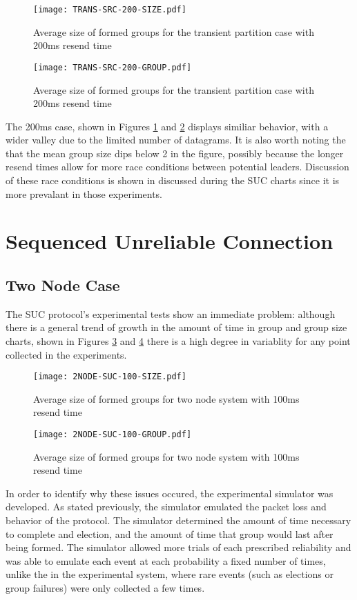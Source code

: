 \begin{figure}[!h]
\centering
\texttt{[image: TRANS-SRC-200-SIZE.pdf]}
\caption{Average size of formed groups for the transient partition case with 200ms resend time}
\label{fig:MGS-SRC-TRANS-200}
\end{figure}

\begin{figure}[!h]
\centering
\texttt{[image: TRANS-SRC-200-GROUP.pdf]}
\caption{Average size of formed groups for the transient partition case with 200ms resend time}
\label{fig:IGT-SRC-TRANS-200}
\end{figure}

The 200ms case, shown in Figures \ref{fig:MGS-SRC-TRANS-200} and \ref{fig:IGT-SRC-TRANS-200} displays similiar behavior, with a wider valley due to the
limited number of datagrams. It is also worth noting the that the mean group
size dips below 2 in the figure, possibly because the longer resend times allow
for more race conditions between potential leaders. Discussion of these race
conditions is shown in discussed during the SUC charts since it is more prevalant
in those experiments.

\section{Sequenced Unreliable Connection}

\subsection{Two Node Case}

The SUC protocol's experimental tests show an immediate problem: although there
is a general trend of growth in the amount of time in group and group size
charts, shown in Figures \ref{fig:MGS-SUC-2NODE-100} and \ref{fig:IGT-SUC-2NODE-100}
there is a high degree in variablity for any point collected in the experiments.

\begin{figure}[!h]
\centering
\texttt{[image: 2NODE-SUC-100-SIZE.pdf]}
\caption{Average size of formed groups for two node system with 100ms resend time}
\label{fig:MGS-SUC-2NODE-100}
\end{figure}

\begin{figure}[!h]
\centering
\texttt{[image: 2NODE-SUC-100-GROUP.pdf]}
\caption{Average size of formed groups for two node system with 100ms resend time}
\label{fig:IGT-SUC-2NODE-100}
\end{figure}

In order to identify why these issues occured, the experimental simulator was
developed. As stated previously, the simulator emulated the packet loss and
behavior of the protocol. The simulator determined the amount of time necessary
to complete and election, and the amount of time that group would last after
being formed. The simulator allowed more trials of each prescribed reliability
and was able to emulate each event at each probability a fixed number of times,
unlike the in the experimental system, where rare events (such as elections
or group failures) were only collected a few times.



